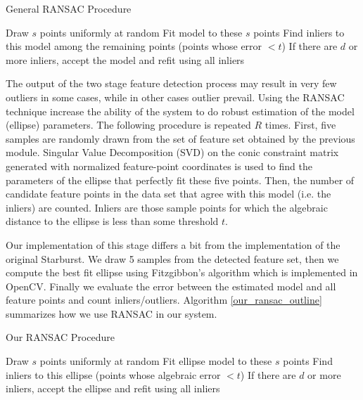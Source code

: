 \documentclass[12pt,fleqn]{book} %
\begin{document}
\begin{algorithm}
\begin{dBox}
	\caption{General RANSAC Procedure} \label{ransac_outline}
	\begin{algorithmic}[1]
			\State Draw $s$ points uniformly at random
			\State Fit model to these $s$ points
			\State Find inliers to this model among the remaining points (points whose error $ < t$)
			\State If there are $d$ or more inliers, accept the model and refit using all inliers	
		\EndWhile	
		\EndProcedure	
	\end{algorithmic}
\end{dBox}	
\end{algorithm}


The output of the two stage feature detection process may result in very few outliers in some cases, while in other cases outlier prevail. Using the RANSAC technique increase the ability of the system to do robust estimation of the model (ellipse) parameters. The following procedure is repeated $R$ times. First, five samples are randomly drawn from the set of feature set obtained by the previous module.  Singular Value Decomposition (SVD) on the conic constraint matrix generated with normalized feature-point coordinates \cite{multipleViewGeom} is used to find the parameters of the ellipse that perfectly fit these five points. Then, the number of candidate feature points in the data set that agree with this model (i.e. the inliers) are counted. Inliers are those sample points for which the algebraic distance to the ellipse is less than some threshold $t$. \bigskip

Our implementation of this stage differs a bit from the implementation of the original Starburst. We draw 5 samples from the detected feature set, then we compute the best fit ellipse using Fitzgibbon's algorithm \cite{fitzgibbon96} which is implemented in OpenCV. Finally we evaluate the error between the estimated model and all feature points and count inliers/outliers. Algorithm \ref{our_ransac_outline} summarizes how we use RANSAC in our system. \bigskip

\begin{algorithm}
\begin{dBox}
	\caption{Our RANSAC Procedure} \label{our_ransac_outline}
	\begin{algorithmic}[1]
			\State Draw $s$ points uniformly at random
			\State Fit ellipse model to these $s$ points
			\State Find inliers to this ellipse (points whose algebraic error $ < t$)
			\State If there are $d$ or more inliers, accept the ellipse and refit using all inliers	
		\EndWhile	
		\EndProcedure	
	\end{algorithmic}
\end{dBox}	
\end{algorithm}
\end{document}
